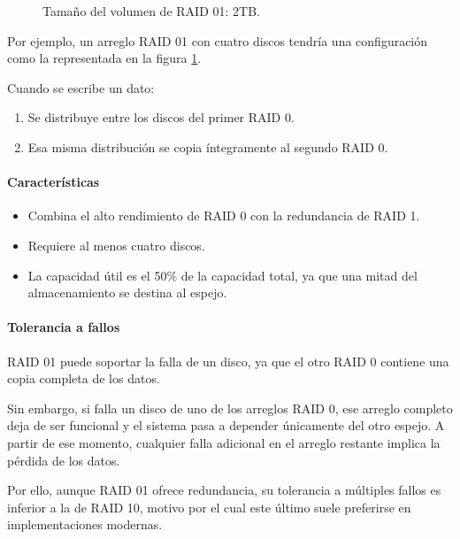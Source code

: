 \begin{figure}[!ht]
  \caption{Tamaño del volumen de RAID 01: 2TB.}
  \label{fig:raid01}
\end{figure}

Por ejemplo, un arreglo RAID 01 con cuatro discos tendría una configuración como la representada en la figura \ref{fig:raid01}.

Cuando se escribe un dato:
\begin{enumerate}
  \item Se distribuye entre los discos del primer RAID 0.
  \item Esa misma distribución se copia íntegramente al segundo RAID 0.
\end{enumerate}

\paragraph{Características}
\begin{itemize}
  \item Combina el alto rendimiento de RAID 0 con la redundancia de RAID 1.
  \item Requiere al menos cuatro discos.
  \item La capacidad útil es el 50\% de la capacidad total, ya que una mitad del almacenamiento se destina al espejo.
\end{itemize}

\paragraph{Tolerancia a fallos}
RAID 01 puede soportar la falla de un disco, ya que el otro RAID 0 contiene una copia completa de los datos.

Sin embargo, si falla un disco de uno de los arreglos RAID 0, ese arreglo completo deja de ser funcional y el sistema pasa a depender únicamente del otro espejo. A partir de ese momento, cualquier falla adicional en el arreglo restante implica la pérdida de los datos.

Por ello, aunque RAID 01 ofrece redundancia, su tolerancia a múltiples fallos es inferior a la de RAID 10, motivo por el cual este último suele preferirse en implementaciones modernas.


